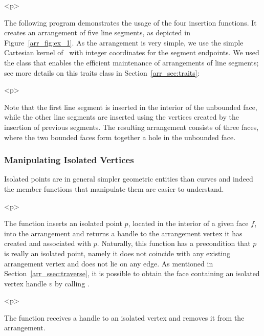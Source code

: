 \begin{ccHtmlOnly}<p>\end{ccHtmlOnly}
The following program demonstrates the usage of the four insertion
functions. It creates an arrangement of five line segments, as
depicted in Figure~\ref{arr_fig:ex_1}. As the arrangement is very
simple, we use the simple Cartesian kernel of \cgal\ with integer
coordinates for the segment endpoints. We used the 
 class that enables the efficient
maintenance of arrangements of line segments; see more details on
this traits class in Section~\ref{arr_sec:traits}:


\begin{ccHtmlOnly}<p>\end{ccHtmlOnly}
Note that the first line segment is inserted in the interior of
the unbounded face, while the other line segments are inserted
using the vertices created by the insertion of previous segments.
The resulting arrangement consists of three faces, where the two
bounded faces form together a hole in the unbounded face.

\subsubsection{Manipulating Isolated Vertices}
\label{arr_sssec:mf_iso_verts}
%
Isolated points are in general simpler geometric entities than
curves and indeed the member functions that manipulate them are
easier to understand.

\begin{ccHtmlOnly}<p>\end{ccHtmlOnly}
The function  inserts an
isolated point $p$, located in the interior of a given face $f$,
into the arrangement and returns a handle to the arrangement
vertex it has created and associated with $p$. Naturally, this
function has a precondition that $p$ is really an isolated point,
namely it does not coincide with any existing arrangement vertex
and does not lie on any edge. As mentioned in
Section~\ref{arr_ssec:traverse}, it is possible to obtain the face
containing an isolated vertex handle $v$ by calling .

\begin{ccHtmlOnly}<p>\end{ccHtmlOnly}
The function  receives a handle to
an isolated vertex and removes it from the arrangement.

